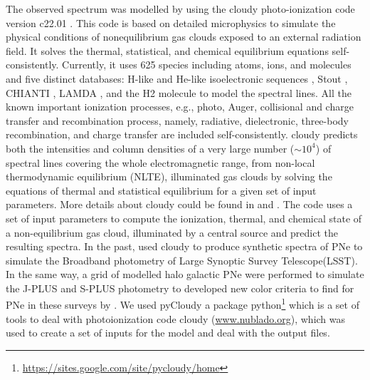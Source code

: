 \documentclass[fleqn,usenatbib]{mnras}
\begin{document}
{The observed spectrum was modelled by using the {\sc cloudy}
photo-ionization code version c22.01 \citep{Ferland:2017}. This
code is based on detailed microphysics to simulate the physical
conditions of nonequilibrium gas clouds exposed to an external
radiation field. It solves the thermal, statistical, and chemical
equilibrium equations self-consistently. Currently, it uses 625
species including atoms, ions, and molecules and five distinct
databases: H-like and He-like isoelectronic sequences \citep{Porter:2012},
Stout \citep{Lykins:2015}, CHIANTI \citep{Landi:2012},
LAMDA \citep{Schoier:2005}, and the H2 molecule
\citep{Shaw:2005} to model the spectral lines. All the known
important ionization processes, e.g., photo, Auger, collisional
and charge transfer and recombination process, namely,
radiative, dielectronic, three-body recombination, and charge
transfer are included self-consistently. {\sc cloudy} predicts both
the intensities and column densities of a very large number
($\sim 10^{4}$) of spectral lines covering the whole electromagnetic
range, from non-local thermodynamic equilibrium (NLTE),
illuminated gas clouds by solving the equations of thermal and
statistical equilibrium for a given set of input parameters. More
details about {\sc cloudy} could be found in \citet{Ferland:2013}
and \citet{Pandey:2022}. The code uses a set of input parameters to compute the
ionization, thermal, and chemical state of a non-equilibrium gas cloud,
illuminated by a central source and predict the resulting spectra. 
In the past, \citet{Vejar:2019} used {\sc cloudy} to produce
synthetic spectra of PNe to simulate the  Broadband photometry
of Large Synoptic Survey Telescope(LSST). In the same way, a grid of modelled
halo galactic PNe were performed to simulate the J-PLUS and S-PLUS photometry
to developed new color criteria to find for PNe in these surveys
by \citet{Gutierrez-Soto:2020}. We used {\sc pyCloudy} \citep{Morisset:2013} a
package python\footnote{\url{https://sites.google.com/site/pycloudy/home}} which
is a set of tools to deal with photoionization code {\sc cloudy} (\url{www.nublado.org}),
which was used to create a set of inputs for the model and deal with the output files.

}
\end{document}
